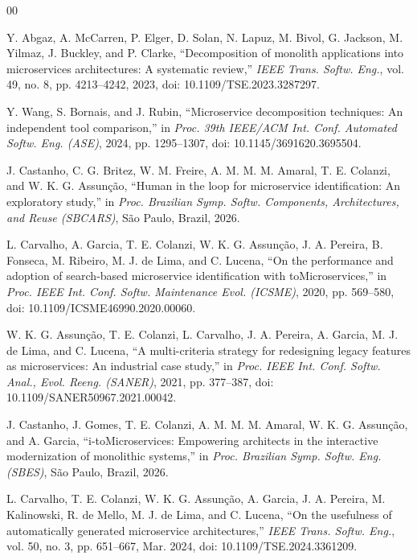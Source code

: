 \documentclass[conference]{IEEEtran}
\newcommand{\itm}{\mbox{i-toMicroservices}}
\begin{document}
\begin{thebibliography}{00}

 Y. Abgaz, A. McCarren, P. Elger, D. Solan, N. Lapuz, M. Bivol, G. Jackson, M. Yilmaz, J. Buckley, and P. Clarke, ``Decomposition of monolith applications into microservices architectures: A systematic review,'' \textit{IEEE Trans. Softw. Eng.}, vol. 49, no. 8, pp. 4213--4242, 2023, doi: 10.1109/TSE.2023.3287297.

 Y. Wang, S. Bornais, and J. Rubin, ``Microservice decomposition techniques: An independent tool comparison,'' in \textit{Proc. 39th IEEE/ACM Int. Conf. Automated Softw. Eng. (ASE)}, 2024, pp. 1295--1307, doi: 10.1145/3691620.3695504.

 J. Castanho, C. G. Britez, W. M. Freire, A. M. M. M. Amaral, T. E. Colanzi, and W. K. G. Assunção, ``Human in the loop for microservice identification: An exploratory study,'' in \textit{Proc. Brazilian Symp. Softw. Components, Architectures, and Reuse (SBCARS)}, São Paulo, Brazil, 2026.

 L. Carvalho, A. Garcia, T. E. Colanzi, W. K. G. Assunção, J. A. Pereira, B. Fonseca, M. Ribeiro, M. J. de Lima, and C. Lucena, ``On the performance and adoption of search-based microservice identification with toMicroservices,'' in \textit{Proc. IEEE Int. Conf. Softw. Maintenance Evol. (ICSME)}, 2020, pp. 569--580, doi: 10.1109/ICSME46990.2020.00060.

 W. K. G. Assunção, T. E. Colanzi, L. Carvalho, J. A. Pereira, A. Garcia, M. J. de Lima, and C. Lucena, ``A multi-criteria strategy for redesigning legacy features as microservices: An industrial case study,'' in \textit{Proc. IEEE Int. Conf. Softw. Anal., Evol. Reeng. (SANER)}, 2021, pp. 377--387, doi: 10.1109/SANER50967.2021.00042.

 J. Castanho, J. Gomes, T. E. Colanzi, A. M. M. M. Amaral, W. K. G. Assunção, and A. Garcia, ``\itm{}: Empowering architects in the interactive modernization of monolithic systems,'' in \textit{Proc. Brazilian Symp. Softw. Eng. (SBES)}, São Paulo, Brazil, 2026.

 L. Carvalho, T. E. Colanzi, W. K. G. Assunção, A. Garcia, J. A. Pereira, M. Kalinowski, R. de Mello, M. J. de Lima, and C. Lucena, ``On the usefulness of automatically generated microservice architectures,'' \textit{IEEE Trans. Softw. Eng.}, vol. 50, no. 3, pp. 651--667, Mar. 2024, doi: 10.1109/TSE.2024.3361209.


\end{thebibliography}
\end{document}
